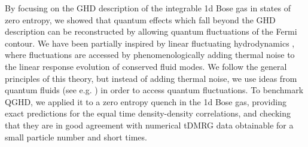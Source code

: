 \documentclass[twocolumn,amsfonts,showpacs,superscriptaddress]{revtex4-1}
\begin{document}
\vspace{0.1cm}
\; By focusing on the GHD description of the integrable 1d Bose gas in states of zero entropy, we showed that quantum effects which fall beyond the GHD description can be reconstructed by allowing quantum fluctuations of the Fermi contour.
We have been partially inspired by linear fluctuating hydrodynamics \cite{abanov2006hydrodynamics,spohn2014nlfh}, where
fluctuations are accessed by phenomenologically adding thermal noise to the linear response evolution of conserved fluid modes.
We follow the general principles of this theory, but instead of adding thermal noise, we use ideas from quantum fluids
(see e.g. \cite{abanov2006hydrodynamics}) in order to access quantum fluctuations.
To benchmark QGHD, we applied it to a zero entropy quench in the 1d Bose gas, providing exact predictions for the equal time density-density correlations, and checking that they are in good agreement with numerical tDMRG data obtainable for a small particle number and short times.



\end{document}
